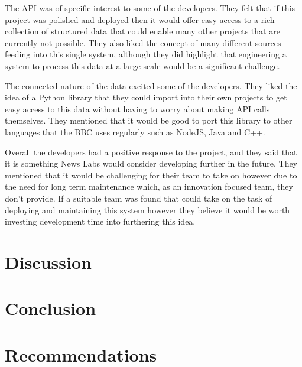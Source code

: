 \documentclass[12pt,titlepage]{article}
\begin{document}
  The API was of specific interest to some of the developers. They felt that if
  this project was polished and deployed then it would offer easy access to a
  rich collection of structured data that could enable many other projects that
  are currently not possible. They also liked the concept of many different
  sources feeding into this single system, although they did highlight that
  engineering a system to process this data at a large scale would be a
  significant challenge.

  The connected nature of the data excited some of the developers. They liked
  the idea of a Python library that they could import into their own projects to
  get easy access to this data without having to worry about making API calls
  themselves. They mentioned that it would be good to port this library to other
  languages that the BBC uses regularly such as NodeJS, Java and C++.

  Overall the developers had a positive response to the project, and they said
  that it is something News Labs would consider developing further in the
  future. They mentioned that it would be challenging for their team to take on
  however due to the need for long term maintenance which, as an innovation
  focused team, they don't provide. If a suitable team was found that could take
  on the task of deploying and maintaining this system however they believe it
  would be worth investing development time into furthering this idea.

\section{Discussion}


\section{Conclusion}


\section{Recommendations}



\end{document}
